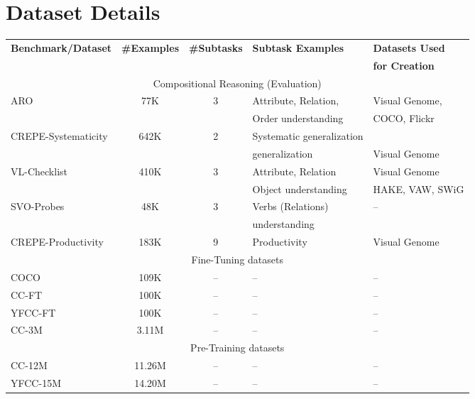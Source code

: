\documentclass[11pt]{article}
\newcommand{\methodcompbold}{\textbf{MosaiCLIP}}
\newcommand{\clip}{CLIP}
\newcommand{\negclip}{NegCLIP}
\begin{document}
\begin{table*}[h!]
  \caption{Results on {\color{blue} ImageNet - Natural Distribution Shifts datasets}. \methodcompbold{} leads to improved robustness to natural distribution shifts. \negclip{} performs similarly as \clip{}. Models are zero-shot tested on ImageNet-A \citep{Hendrycks_2021_CVPR}, ImageNet-R \citep{hendrycks2021many}, ImageNet-S(ketch) \citep{wang2019learning} and ImageNet-V2 \citep{recht2019imagenet}.}
  \label{tab:rob_nat_shifts}
\end{table*}


\section{Dataset Details}
\label{data_details}
\begin{table*}[h!]
  \centering
  \begin{tabular}{lcc@{\hspace{0.75em}}ll}
    \toprule
    \textbf{Benchmark/Dataset} & \textbf{\#Examples} & \textbf{\#Subtasks} & \textbf{Subtask Examples} & \textbf{Datasets Used}\\
    & & & & \textbf{for Creation}\\
    \midrule
    \multicolumn{5}{c}{Compositional Reasoning (Evaluation)}\\
    \midrule
    \rowcolor{gray!12}
    ARO & 77K & 3 & Attribute, Relation, & Visual Genome,\\
    \rowcolor{gray!12}
    & & & Order understanding & COCO, Flickr \\
    CREPE-Systematicity & 642K & 2 & Systematic generalization & \\
    & & & generalization & Visual Genome\\
    \rowcolor{gray!12}
    VL-Checklist & 410K & 3 & Attribute, Relation & Visual Genome\\
    \rowcolor{gray!12}
    & & & Object understanding & HAKE, VAW, SWiG\\
    SVO-Probes & 48K & 3 & Verbs (Relations) & --\\
    & & & understanding & \\
    \rowcolor{gray!12}
    CREPE-Productivity & 183K & 9 & Productivity & Visual Genome\\
    \midrule
    \multicolumn{5}{c}{Fine-Tuning datasets} \\
    \midrule
    \rowcolor{gray!12}
    COCO & 109K & -- & -- & --\\
    CC-FT & 100K & -- & -- & --\\
    \rowcolor{gray!12}
    YFCC-FT & 100K & -- & -- & --\\
    CC-3M & 3.11M & -- & -- & --\\
    \midrule
    \multicolumn{5}{c}{Pre-Training datasets} \\
    \midrule
    \rowcolor{gray!12}
    CC-12M & 11.26M & -- & -- & --\\
    YFCC-15M & 14.20M & -- & -- & --\\
    \bottomrule
  \end{tabular}


\end{table*}
\end{document}
